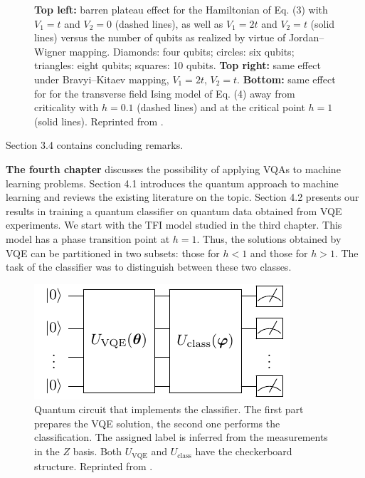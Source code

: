 \begin{figure}
\begin{subfigure}{.48\linewidth}
    \end{subfigure}
    \caption{\textbf{Top left:} barren plateau effect for the Hamiltonian of Eq. (3) with
    $V_1 = t$ and $V_2 = 0$ (dashed lines), as well as $V_1 = 2t$ and $V_2 = t$
    (solid lines) versus the number of qubits as realized by virtue of
    Jordan--Wigner mapping. Diamonds: four qubits; circles: six qubits;
    triangles: eight qubits; squares: 10 qubits. \textbf{Top right:} same effect under Bravyi--Kitaev mapping, $V_1 = 2t$, $V_2 = t$.
    \textbf{Bottom:} same effect for for the transverse field Ising model of Eq. (4) away from criticality with $h = 0.1$ (dashed lines) and at the critical point $h = 1$ (solid lines).    
    Reprinted from \cite{uvarov_variational_2020}.}
    \label{fig:plateaus_hubbard_ising}
\end{figure}

Section 3.4 contains concluding remarks. 

\textbf{The fourth chapter} discusses the possibility of applying VQAs to machine learning problems. Section 4.1 introduces the quantum approach to machine learning and reviews the existing literature on the topic. Section 4.2 presents our results in training a quantum classifier on quantum data obtained from VQE experiments. We start with the TFI model studied in the third chapter. This model has a phase transition point at $h=1$. Thus, the solutions obtained by VQE can be partitioned in two subsets: those for $h<1$ and those for $h>1$. The task of the classifier was to distinguish between these two classes.

\begin{figure}
    \centering
    \includegraphics[width=0.7\linewidth]{../figures/classifier_circuit.pdf}
    \caption{Quantum circuit that implements the classifier. The first part prepares the VQE solution, the second one performs the classification. The assigned label is inferred from the measurements in the $Z$ basis. Both $U_{\mathrm{VQE}}$ and $U_{\mathrm{class}}$ have the checkerboard structure. Reprinted from \cite{uvarov_machine_2020}.}
    \label{fig:classifier_scheme}
\end{figure}

